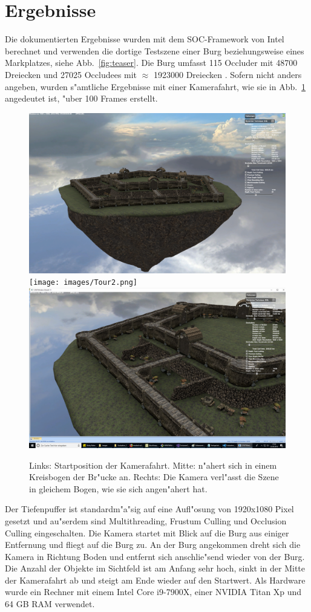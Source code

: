 \documentclass[journal]{vgtc}
\begin{document}
\section{Ergebnisse}
Die dokumentierten Ergebnisse wurden mit dem SOC-Framework von Intel berechnet und verwenden die dortige Testszene einer Burg beziehungsweise eines Markplatzes, siehe Abb.\ \ref{fig:teaser}. Die Burg umfasst 115 Occluder mit 48700 Dreiecken und 27025 Occludees mit $\approx$ 1923000 Dreiecken \cite{MSOC}. Sofern nicht anders angeben, wurden s"amtliche Ergebnisse mit einer Kamerafahrt, wie sie in Abb.\ \ref{fig:fahrt} angedeutet ist, "uber 100 Frames erstellt.
\begin{figure}%
\includegraphics[width=0.33\columnwidth]{images/Tour1.png}%
\texttt{[image: images/Tour2.png]}%
\includegraphics[width=0.33\columnwidth]{images/Tour3.png}%
\caption{Links: Startposition der Kamerafahrt. Mitte: n"ahert sich in einem Kreisbogen der Br"ucke an. Rechts: Die Kamera verl"asst die Szene in gleichem Bogen, wie sie sich angen"ahert hat.}%
\label{fig:fahrt}%
\end{figure}
Der Tiefenpuffer ist standardm"a"sig auf eine Aufl"osung von 1920x1080 Pixel gesetzt und au"serdem sind Multithreading, Frustum Culling und Occlusion Culling eingeschalten. Die Kamera startet mit Blick auf die Burg aus einiger Entfernung und fliegt auf die Burg zu. An der Burg angekommen dreht sich die Kamera in Richtung Boden und entfernt sich anschlie"send wieder von der Burg. Die Anzahl der Objekte im Sichtfeld ist am Anfang sehr hoch, sinkt in der Mitte der Kamerafahrt ab und steigt am Ende wieder auf den Startwert. Als Hardware wurde ein Rechner mit einem Intel Core i9-7900X, einer NVIDIA Titan Xp und 64 GB RAM verwendet.\\
\end{document}
